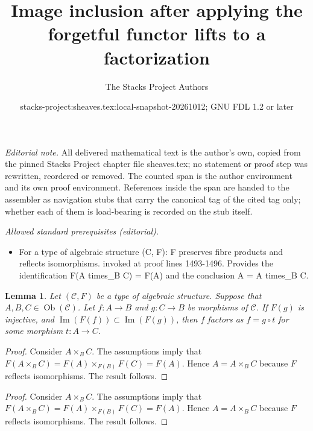 \documentclass{stacks-project}
\title{Image inclusion after applying the forgetful functor lifts to a factorization}
\author{The Stacks Project Authors}
\date{stacks-project:sheaves.tex:local-snapshot-20261012; GNU FDL 1.2 or later}
\theoremstyle{plain}
\newtheorem{lemma}[subsection]{Lemma}
\theoremstyle{definition}
\theoremstyle{remark}
\numberwithin{equation}{subsection}
\def\Ob{\mathop{\mathrm{Ob}}\nolimits}
\def\Im{\mathop{\mathrm{Im}}}
\begin{document}
\maketitle
\setcounter{subsection}{1}
\noindent\textit{Editorial note.} All delivered mathematical text is the author's own, copied from the pinned Stacks Project chapter file sheaves.tex; no statement or proof step was rewritten, reordered or removed. The counted span is the author environment and its own proof environment. References inside the span are handed to the assembler as navigation stubs that carry the canonical tag of the cited tag only; whether each of them is load-bearing is recorded on the stub itself.\par\medskip
\noindent\textit{Allowed standard prerequisites (editorial).}\begin{itemize}
\item For a type of algebraic structure (C, F): F preserves fibre products and reflects isomorphisms. invoked at proof lines 1493-1496. Provides the identification F(A times\_B C) = F(A) and the conclusion A = A times\_B C.
\end{itemize}\medskip
\begin{lemma}
\label{lemma-image-contained-in}
Let $(\mathcal{C}, F)$ be a type of algebraic structure.
Suppose that $A, B, C \in \Ob(\mathcal{C})$.
Let $f : A \to B$ and $g : C \to B$ be morphisms of
$\mathcal{C}$. If $F(g)$ is injective, and
$\Im(F(f)) \subset \Im(F(g))$, then
$f$ factors as $f = g \circ t$ for some morphism
$t : A \to C$.
\end{lemma}

\begin{proof}
Consider $A \times_B C$. The assumptions imply that
$F(A \times_B C) = F(A) \times_{F(B)} F(C) = F(A)$.
Hence $A = A \times_B C$ because $F$ reflects isomorphisms.
The result follows.
\end{proof}

\begin{proof}
Consider $A \times_B C$. The assumptions imply that
$F(A \times_B C) = F(A) \times_{F(B)} F(C) = F(A)$.
Hence $A = A \times_B C$ because $F$ reflects isomorphisms.
The result follows.
\end{proof}
\end{document}
